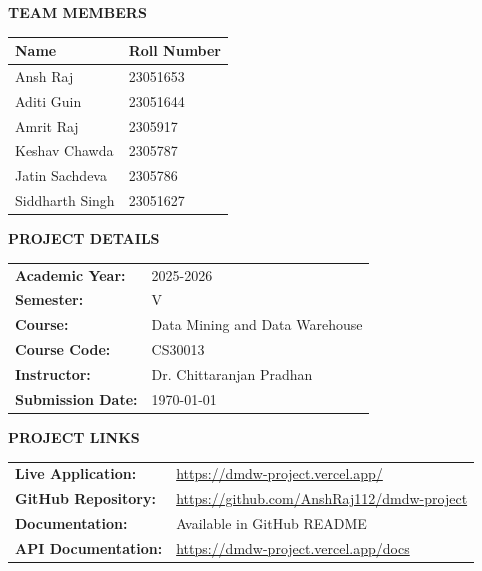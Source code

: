 \documentclass[12pt,a4paper]{article}
\begin{document}
\begin{titlepage}
    {\Large \textbf{TEAM MEMBERS}}\\[0.5cm]
    \begin{minipage}{0.8\textwidth}
        \centering
        \begin{tabular}{|l|l|}
            \hline
            \textbf{Name} & \textbf{Roll Number} \\
            \hline
            Ansh Raj & 23051653 \\
            \hline
            Aditi Guin & 23051644 \\
            \hline
            Amrit Raj & 2305917 \\
            \hline
            Keshav Chawda & 2305787 \\
            \hline
            Jatin Sachdeva & 2305786 \\
            \hline
            Siddharth Singh & 23051627 \\
            \hline
        \end{tabular}
    \end{minipage}
    
    \vspace{2cm}
    
    {\Large \textbf{PROJECT DETAILS}}\\[0.5cm]
    \begin{minipage}{0.8\textwidth}
        \centering
        \begin{tabular}{ll}
            \textbf{Academic Year:} & 2025-2026 \\
            \textbf{Semester:} & V \\
            \textbf{Course:} & Data Mining and Data Warehouse \\
            \textbf{Course Code:} & CS30013 \\
            \textbf{Instructor:} & Dr. Chittaranjan Pradhan \\
            \textbf{Submission Date:} & \today \\
        \end{tabular}
    \end{minipage}
    
    \vspace{2cm}
    
    {\Large \textbf{PROJECT LINKS}}\\[0.5cm]
    \begin{minipage}{0.8\textwidth}
        \centering
        \begin{tabular}{ll}
            \textbf{Live Application:} & \url{https://dmdw-project.vercel.app/} \\
            \textbf{GitHub Repository:} & \url{https://github.com/AnshRaj112/dmdw-project} \\
            \textbf{Documentation:} & Available in GitHub README \\
            \textbf{API Documentation:} & \url{https://dmdw-project.vercel.app/docs} \\
        \end{tabular}
    \end{minipage}
    

\end{titlepage}
\end{document}

